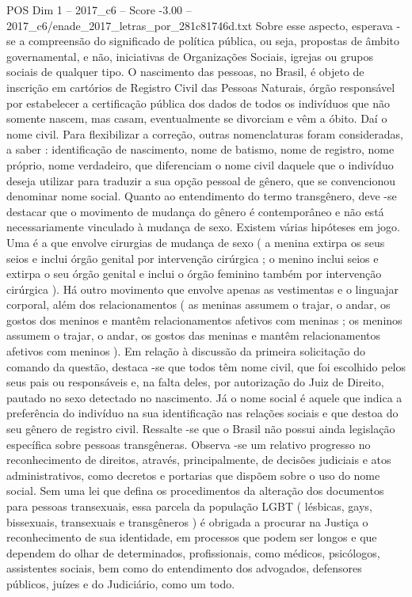 \begin{textsample}{POS Dim 1 – 2017\_c6 – Score -3.00 – 2017\_c6/enade\_2017\_letras\_por\_281c81746d.txt}
Sobre esse aspecto, esperava -se a compreensão do significado de política pública, ou seja, propostas de âmbito governamental, e não, iniciativas de Organizações Sociais, igrejas ou grupos sociais de qualquer tipo.
O nascimento das pessoas, no Brasil, é objeto de inscrição em cartórios de Registro Civil das Pessoas Naturais, órgão responsável por estabelecer a certificação pública dos dados de todos os indivíduos que não somente nascem, mas casam, eventualmente se divorciam e vêm a óbito.
Daí o nome civil.
Para flexibilizar a correção, outras nomenclaturas foram consideradas, a saber : identificação de nascimento, nome de batismo, nome de registro, nome próprio, nome verdadeiro, que diferenciam o nome civil daquele que o indivíduo deseja utilizar para traduzir a sua opção pessoal de gênero, que se convencionou denominar nome social.
Quanto ao entendimento do termo transgênero, deve -se destacar que o movimento de mudança do gênero é contemporâneo e não está necessariamente vinculado à mudança de sexo.
Existem várias hipóteses em jogo.
Uma é a que envolve cirurgias de mudança de sexo ( a menina extirpa os seus seios e inclui órgão genital por intervenção cirúrgica ; o menino inclui seios e extirpa o seu órgão genital e inclui o órgão feminino também por intervenção cirúrgica ).
Há outro movimento que envolve apenas as vestimentas e o linguajar corporal, além dos relacionamentos ( as meninas assumem o trajar, o andar, os gostos dos meninos e mantêm relacionamentos afetivos com meninas ; os meninos assumem o trajar, o andar, os gostos das meninas e mantêm relacionamentos afetivos com meninos ).
Em relação à discussão da primeira solicitação do comando da questão, destaca -se que todos têm nome civil, que foi escolhido pelos seus pais ou responsáveis e, na falta deles, por autorização do Juiz de Direito, pautado no sexo detectado no nascimento.
Já o nome social é aquele que indica a preferência do indivíduo na sua identificação nas relações sociais e que destoa do seu gênero de registro civil.
Ressalte -se que o Brasil não possui ainda legislação específica sobre pessoas transgêneras.
Observa -se um relativo progresso no reconhecimento de direitos, através, principalmente, de decisões judiciais e atos administrativos, como decretos e portarias que dispõem sobre o uso do nome social.
Sem uma lei que defina os procedimentos da alteração dos documentos para pessoas transexuais, essa parcela da população LGBT ( lésbicas, gays, bissexuais, transexuais e transgêneros ) é obrigada a procurar na Justiça o reconhecimento de sua identidade, em processos que podem ser longos e que dependem do olhar de determinados, profissionais, como médicos, psicólogos, assistentes sociais, bem como do entendimento dos advogados, defensores públicos, juízes e do Judiciário, como um todo.

\end{textsample}
